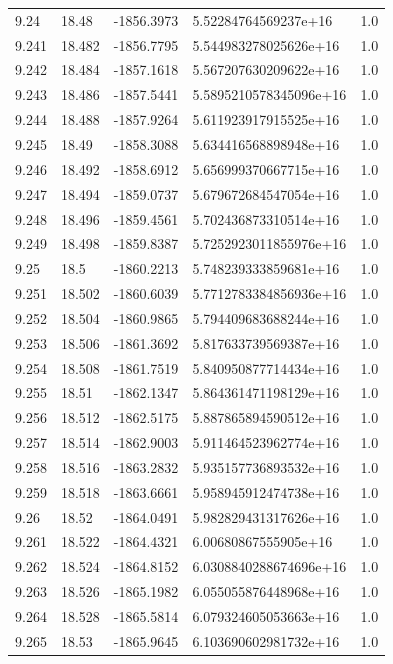 \begin{tabular}{lllll}
9.24 & 18.48 & -1856.3973 & 5.52284764569237e+16 & 1.0 \\
9.241 & 18.482 & -1856.7795 & 5.544983278025626e+16 & 1.0 \\
9.242 & 18.484 & -1857.1618 & 5.567207630209622e+16 & 1.0 \\
9.243 & 18.486 & -1857.5441 & 5.5895210578345096e+16 & 1.0 \\
9.244 & 18.488 & -1857.9264 & 5.611923917915525e+16 & 1.0 \\
9.245 & 18.49 & -1858.3088 & 5.634416568898948e+16 & 1.0 \\
9.246 & 18.492 & -1858.6912 & 5.656999370667715e+16 & 1.0 \\
9.247 & 18.494 & -1859.0737 & 5.679672684547054e+16 & 1.0 \\
9.248 & 18.496 & -1859.4561 & 5.702436873310514e+16 & 1.0 \\
9.249 & 18.498 & -1859.8387 & 5.7252923011855976e+16 & 1.0 \\
9.25 & 18.5 & -1860.2213 & 5.748239333859681e+16 & 1.0 \\
9.251 & 18.502 & -1860.6039 & 5.7712783384856936e+16 & 1.0 \\
9.252 & 18.504 & -1860.9865 & 5.794409683688244e+16 & 1.0 \\
9.253 & 18.506 & -1861.3692 & 5.817633739569387e+16 & 1.0 \\
9.254 & 18.508 & -1861.7519 & 5.840950877714434e+16 & 1.0 \\
9.255 & 18.51 & -1862.1347 & 5.864361471198129e+16 & 1.0 \\
9.256 & 18.512 & -1862.5175 & 5.887865894590512e+16 & 1.0 \\
9.257 & 18.514 & -1862.9003 & 5.911464523962774e+16 & 1.0 \\
9.258 & 18.516 & -1863.2832 & 5.935157736893532e+16 & 1.0 \\
9.259 & 18.518 & -1863.6661 & 5.958945912474738e+16 & 1.0 \\
9.26 & 18.52 & -1864.0491 & 5.982829431317626e+16 & 1.0 \\
9.261 & 18.522 & -1864.4321 & 6.00680867555905e+16 & 1.0 \\
9.262 & 18.524 & -1864.8152 & 6.0308840288674696e+16 & 1.0 \\
9.263 & 18.526 & -1865.1982 & 6.055055876448968e+16 & 1.0 \\
9.264 & 18.528 & -1865.5814 & 6.079324605053663e+16 & 1.0 \\
9.265 & 18.53 & -1865.9645 & 6.103690602981732e+16 & 1.0 \\

\end{tabular}
